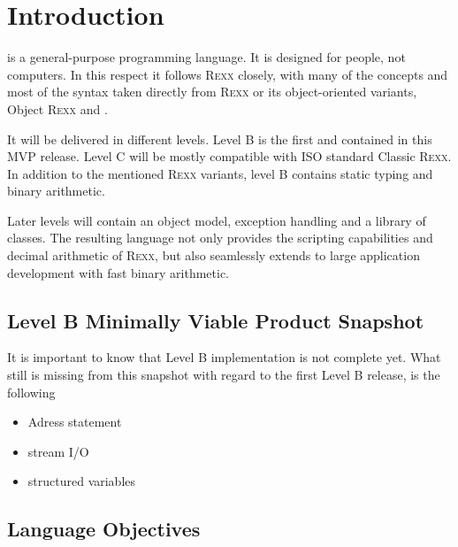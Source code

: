 \chapter{Introduction}
\crexx{} is a general-purpose programming language. It is designed for
people, not computers. In this respect it follows R\textsc{exx} closely, with
many of the concepts and most of the syntax taken directly from R\textsc{exx}
or its object-oriented variants, Object R\textsc{exx} and \nr{}.

It will be delivered in different levels. Level B is the first and
contained in this MVP release. Level C will be mostly compatible with
ISO standard Classic \textsc{Rexx}. 
In addition to the mentioned \textsc{Rexx} variants, \crexx{} level B contains 
static typing and binary arithmetic.

Later levels will contain an object model, exception
handling and a library of classes. The resulting language not only provides the scripting
capabilities and decimal arithmetic of R\textsc{exx}, but also seamlessly
extends to large application development with fast binary arithmetic.

\section{Level B Minimally Viable Product Snapshot}
It is important to know that Level B implementation is not complete
yet. What still is missing from this snapshot with
regard to the first \crexx{} Level B release, is the following
\begin{itemize}
\item Adress statement
\item stream I/O
\item structured variables
\end{itemize}

\section{Language Objectives}

